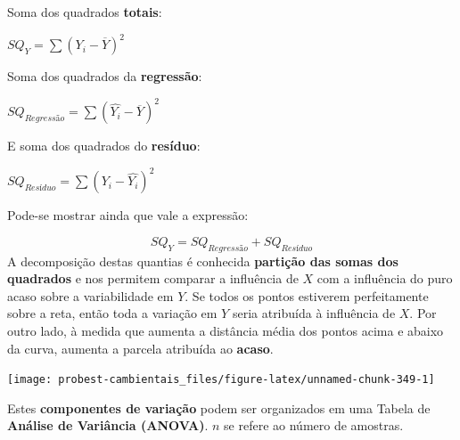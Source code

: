 \documentclass[
]{book}
\begin{document}
Soma dos quadrados \textbf{totais}:

\(SQ_Y = \sum{(Y_i - \overline{Y})^2}\)

Soma dos quadrados da \textbf{regressão}:

\(SQ_{Regressão}= \sum{(\hat{Y_i} - \overline{Y})^2}\)

E soma dos quadrados do \textbf{resíduo}:

\(SQ_{Resíduo}= \sum{(Y_i - \hat{Y_i})^2}\)

Pode-se mostrar ainda que vale a expressão:

\[SQ_Y = SQ_{Regressão} + SQ_{Resíduo}\]
A decomposição destas quantias é conhecida \textbf{partição das somas dos quadrados} e nos permitem comparar a influência de \(X\) com a influência do puro acaso sobre a variabilidade em \(Y\). Se todos os pontos estiverem perfeitamente sobre a reta, então toda a variação em \(Y\) seria atribuída à influência de \(X\). Por outro lado, à medida que aumenta a distância média dos pontos acima e abaixo da curva, aumenta a parcela atribuída ao \textbf{acaso}.

\begin{center}\texttt{[image: probest-cambientais\_files/figure-latex/unnamed-chunk-349-1]} \end{center}

Estes \textbf{componentes de variação} podem ser organizados em uma Tabela de \textbf{Análise de Variância (ANOVA)}. \(n\) se refere ao número de amostras.
\end{document}
